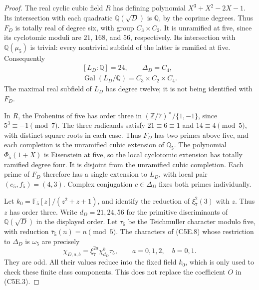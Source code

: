 \begin{proof}
The real cyclic cubic field $R$ has defining polynomial
$X^3+X^2-2X-1$.  Its intersection with each quadratic
$\mathbb Q(\sqrt D)$ is $\mathbb Q$, by the coprime degrees.
Thus $F_D$ is totally real of degree six, with group $C_3\times C_2$.
It is unramified at five, since its cyclotomic moduli are
$21$, $168$, and $56$, respectively.  Its intersection with
$\mathbb Q(\mu_5)$ is trivial: every nontrivial subfield of
the latter is ramified at five.  Consequently
\[
 \begin{gathered}
 [L_D:\mathbb Q]=24,\qquad \Delta_D=C_4,\\
 \operatorname{Gal}(L_D/\mathbb Q)=C_3\times C_2\times C_4.
 \end{gathered}
 \tag{C5E.8}
\]
The maximal real subfield of $L_D$ has degree twelve; it is
not being identified with $F_D$.

In $R$, the Frobenius of five has order three in
$(\mathbb Z/7)^\times/\{1,-1\}$, since $5^3\equiv-1\pmod7$.
The three radicands satisfy $21\equiv6\equiv1$ and
$14\equiv4\pmod5$, with distinct square roots in each case.
Thus $F_D$ has two primes above five, and each completion is
the unramified cubic extension of $\mathbb Q_5$.
The polynomial $\Phi_5(1+X)$ is Eisenstein at five, so the
local cyclotomic extension has totally ramified degree four.
It is disjoint from the unramified cubic completion.
Each prime of $F_D$ therefore has a single extension to $L_D$,
with local pair $(e_5,f_5)=(4,3)$.
Complex conjugation $c\in\Delta_D$ fixes both primes individually.

Let $k_0=\mathbb F_5[z]/(z^2+z+1)$, and identify the reduction
of $\xi_7^2(3)$ with $z$.  Thus $z$ has order three.
Write $d_D=21,24,56$ for the primitive discriminants of
$\mathbb Q(\sqrt D)$ in the displayed order.  Let $\tau_5$
be the Teichmuller character modulo five, with reduction
$\overline\tau_5(n)=n\pmod5$.  The characters of (C5E.8)
whose restriction to $\Delta_D$ is $\omega_5$ are precisely
\[
        \chi_{D,a,b}=\xi_7^{2a}\chi_{d_D}^{b}\tau_5,
                   \qquad a=0,1,2,\quad b=0,1.
 \tag{C5E.9}
\]
They are odd.  All their values reduce into the fixed field
$k_0$, which is only used to check these finite class components.
This does not replace the coefficient $O$ in (C5E.3).


\end{proof}
